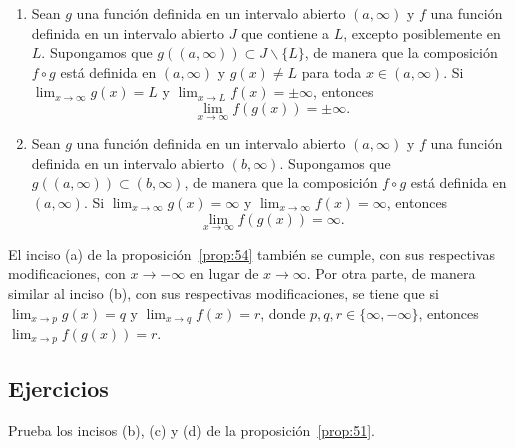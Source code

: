 \documentclass[12pt,a4paper]{book}
\begin{document}
    \begin{proposicion}\label{prop:54}
        \leavevmode
        \begin{enumerate}
            \item Sean $g$ una función definida en un intervalo abierto $(a,\infty)$ y $f$ una función
            definida en un intervalo abierto $J$ que contiene a $L$, excepto posiblemente
            en $L$. Supongamos que $g((a,\infty))\subset J\backslash\{L\}$, de manera que la composición
            $f\circ g$ está definida en $(a,\infty)$ y $g(x)\neq L$ para toda $x\in(a,\infty)$. Si
            $\lim_{x\to\infty}g(x)=L$ y $\lim_{x\to L}f(x)=\pm\infty$, entonces
            \begin{equation*}
                \lim_{x\to\infty}f(g(x))=\pm\infty.
            \end{equation*}
            \item Sean $g$ una función definida en un intervalo abierto $(a,\infty)$ y $f$ una función
            definida en un intervalo abierto $(b,\infty)$. Supongamos que $g((a,\infty))\subset
            (b,\infty)$, de manera que la composición $f\circ g$ está definida en $(a,\infty)$. Si
            $\lim_{x\to\infty}g(x)=\infty$ y $\lim_{x\to\infty}f(x)=\infty$, entonces
            \begin{equation*}
                \lim_{x\to\infty}f(g(x))=\infty.
            \end{equation*}
        \end{enumerate}
    \end{proposicion}

    El inciso (a) de la proposición~\ref{prop:54} también se cumple, con sus respectivas
    modificaciones, con $x\to-\infty$ en lugar de $x\to\infty$. Por otra parte, de manera
    similar al inciso (b), con sus respectivas modificaciones, se tiene que
    si $\lim_{x\to p}g(x)=q$ y $\lim_{x\to q}f(x)=r$, donde $p,q,r\in\{\infty,-\infty\}$, entonces
    $\lim_{x\to p}f(g(x))=r$.

    \par{}\subsection*{Ejercicios}

    \begin{ejercicio}\label{ej:179}
        Prueba los incisos (b), (c) y (d) de la proposición~\ref{prop:51}.
    \end{ejercicio}
\end{document}

